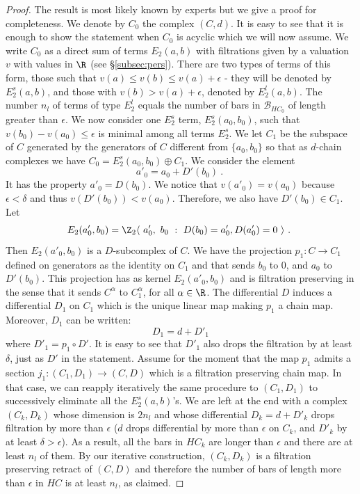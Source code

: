   \begin{proof}
  The result is most likely known by experts but we give a proof for completeness. We denote by 
  $C_{0}$ the complex $(C,d)$. It is easy to see that it is enough to show the statement when $C_{0}$ is acyclic which we will now assume. We write 
  $C_{0}$ as a direct sum of terms $E_{2}(a,b)$   with filtrations given by a valuation $v$ with values in $\R$ (see \S\ref{subsec:pers}). There are two types of terms of this form,
  those such that $v(a)\leq v(b)\leq v(a)+\epsilon$ - they will be denoted
  by $E_{2}^{s}(a,b)$, and those with $v(b)> v(a)+\epsilon$, denoted by 
  $E_{2}^{l}(a,b)$. The number  $n_{l}$ of terms of type $E_{2}^{l}$ equals the number of bars in $\mathcal{B}_{HC_{0}}$ of length greater than $\epsilon$. We now consider one $E_{2}^{s}$ term, $E_{2}^{s}(a_{0},b_{0})$,
such that $v(b_{0})-v(a_{0})\leq \epsilon$ is minimal among all terms $E_{2}^{s}$. We let $C_{1}$ be the subspace of $C$ generated by the generators of $C$ different from $\{a_{0},b_{0}\}$ so that as $d$-chain complexes we have
$C_{0}=E^{s}_{2}(a_{0},b_{0})\oplus C_{1}$.    We consider
the element $$a'_{0}= a_{0} + D'(b_{0})~.~$$ It has the property $a'_{0}=D(b_{0})$. We notice that $v(a'_{0})=v(a_{0})$ because $\epsilon < \delta$ and thus $v(D'(b_{0})) < v(a_{0})$. Therefore, we also have $D'(b_{0})\in C_{1}$.
Let $$ E_{2}(a'_{0}, b_{0})=\Z_2 \langle \  a'_{0},\  b_{0} \ : \ D(b_{0})= a'_{0}, D(a'_{0})=0 \ \rangle ~.~$$ 
Then $E_{2}(a'_{0}, b_{0})$ is a $D$-subcomplex of $C$. We have the projection $p_{1}: C\to C_{1}$ defined on generators as the identity on $C_{1}$ and that sends $b_{0}$ to $0$, and $a_{0}$ to $D'(b_{0})$. This projection has as kernel $E_{2}(a'_{0}, b_{0})$  and is 
filtration preserving in the sense that it sends $C^{\alpha}$ to $C^{\alpha}_{1}$, for all $\alpha\in\R$.
The differential $D$ induces a differential $D_{1}$ on $C_{1}$ which is the unique linear map making  $p_{1}$ a chain map. Moreover, $D_{1}$ can be written:
$$D_{1}= d + D'_{1}$$
where $D'_{1}=p_{1} \circ D'$. It is easy to see that $D'_{1}$ also drops the filtration by
at least $\delta$, just as $D'$ in the statement. Assume for the moment that the map $p_{1}$ admits a section $j_{1}: (C_{1}, D_{1}) \to (C, D)$ which is a filtration preserving chain map. In that case, we can reapply iteratively the same procedure to $(C_{1},D_{1})$
to successively eliminate all the $E_{2}^{s}(a,b)$'s. We are left at the end with a complex $(C_{k}, D_{k})$ whose dimension is $2 n_{l}$  and whose differential $D_{k}=d+D'_{k}$ drops filtration by more than $\epsilon$ ($d$ drops differential by more than $\epsilon$ on $C_{k}$, and $D'_{k}$ by at least  $\delta > \epsilon$). As a result, all the bars 
in $HC_{k}$ are longer than $\epsilon$ and there are at least $n_{l}$ of them.
By our iterative construction, $(C_{k},D_{k})$ is a filtration preserving retract of $(C,D)$ and therefore the number of bars of length more than $\epsilon$ in $HC$ is at least $n_{l}$, as claimed. 


\end{proof}
